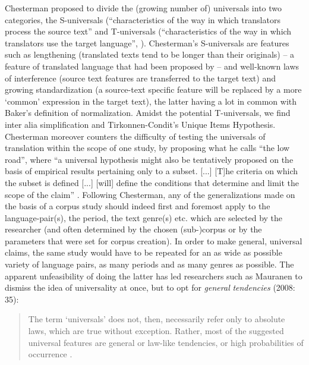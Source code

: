 Chesterman proposed to divide the (growing number of) universals into two categories, the S-universals (“characteristics of the way in which translators process the source text” \citep[39]{gambier_what_2004} and T-universals (“characteristics of the way in which translators use the target language”, \citealt[39]{gambier_what_2004}). Chesterman’s S-universals are features such as lengthening (translated texts tend to be longer than their originals) – a feature of translated language that had been proposed by  \citet[185]{vinay_stylistique_1958} – and  well-known laws of interference (source text features are transferred to the target text) and growing standardization (a source-text specific feature will be replaced by a more ‘common’ expression in the target text), the latter having a lot in common with Baker’s definition of normalization. Amidst the potential T-universals, we find inter alia simplification and Tirkonnen-Condit’s Unique Items Hypothesis. Chesterman moreover counters the difficulty of testing the universals of translation within the scope of one study, by proposing what he calls “the low road”, where “a universal hypothesis might also be tentatively proposed on the basis of empirical results pertaining only to a subset. [...] [T]he criteria on which the subset is defined [...] [will] define the conditions that determine and limit the scope of the claim” \citep[40]{gambier_what_2004}. Following Chesterman, any of the generalizations made on the basis of a corpus study should indeed first and foremost apply to the language-pair(s), the period, the text genre(s) etc. which are selected by the researcher (and often determined by the chosen (sub-)corpus or by the parameters that were set for corpus creation). In order to make general, universal claims, the same study would have to be repeated for an as wide as possible variety of language pairs, as many periods and as many genres as possible. The apparent unfeasibility of doing the latter has led researchers such as Mauranen to dismiss the idea of universality at once, but to opt for \textit{general} \textit{tendencies} (2008: 35):

\begin{quote}
The term ‘universals’ does not, then, necessarily refer only to absolute laws, which are true without exception. Rather, most of the suggested universal features are general or law-like tendencies, or high probabilities of occurrence \citep[35]{anderman_universal_2008}.
\end{quote}

